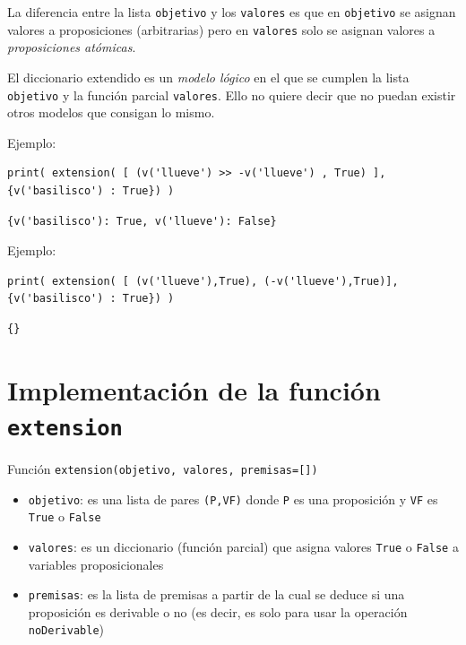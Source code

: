 \documentclass[10pt,a4paper]{report}
\begin{document}
La diferencia entre la lista \texttt{objetivo} y los \texttt{valores} es que en \texttt{objetivo} se asignan valores a proposiciones (arbitrarias) pero en \texttt{valores} solo se asignan valores a \emph{proposiciones atómicas}.

El diccionario extendido es un \emph{modelo lógico} en el que se cumplen la lista \texttt{objetivo} y la función parcial \texttt{valores}.
Ello no quiere decir que no puedan existir otros modelos que consigan lo mismo.

Ejemplo:
\begin{verbatim}
print( extension( [ (v('llueve') >> -v('llueve') , True) ], {v('basilisco') : True}) )
\end{verbatim}

\label{}
\begin{verbatim}
{v('basilisco'): True, v('llueve'): False}
\end{verbatim}



Ejemplo:
\begin{verbatim}
print( extension( [ (v('llueve'),True), (-v('llueve'),True)], {v('basilisco') : True}) )
\end{verbatim}

\label{}
\begin{verbatim}
{}
\end{verbatim}
\section{Implementación de la función  \texttt{extension}}
\label{sec:org131622c}

Función \texttt{extension(objetivo, valores, premisas=[])}

\begin{itemize}
\item \texttt{objetivo}: es una lista de pares \texttt{(P,VF)} donde \texttt{P} es una proposición y \texttt{VF} es \texttt{True} o \texttt{False}

\item \texttt{valores}: es un diccionario (función parcial) que asigna valores \texttt{True} o \texttt{False} a variables proposicionales

\item \texttt{premisas}: es la lista de premisas a partir de la cual se deduce si una proposición es derivable o no (es decir, es solo para usar la operación \texttt{noDerivable})
\end{itemize}
\end{document}
